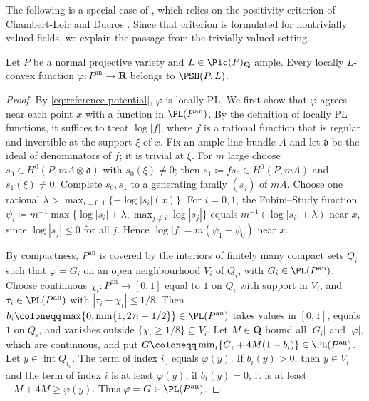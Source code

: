 \documentclass[11pt,a4paper]{article}
\newcommand{\an}{\mathrm{an}}          %
\begin{document}
The following is a special case of \cite[Theorem~3.23]{Wu26}, which relies on the positivity criterion of Chambert-Loir and Ducros \cite{CLD12}. Since that criterion is formulated for nontrivially valued fields, we explain the passage from the trivially valued setting.

\begin{lemma}\label{lem:local-PL-positivity}
Let $P$ be a normal projective variety and $L\in\Pic(P)_{\mathbf Q}$ ample. Every locally $L$-convex function $\varphi\colon P^{\an}\to\mathbf R$ belongs to $\PSH(P,L)$.
\end{lemma}

\begin{proof}
By \eqref{eq:reference-potential}, $\varphi$ is locally PL. We first show that $\varphi$ agrees near each point $x$ with a function in $\PL(P^{\an})$. By the definition of locally PL functions, it suffices to treat $\log|f|$, where $f$ is a rational function that is regular and invertible at the support $\xi$ of $x$. Fix an ample line bundle $A$ and let $\mathfrak d$ be the ideal of denominators of $f$; it is trivial at $\xi$. For $m$ large choose $s_0\in H^0(P,mA\otimes\mathfrak d)$ with $s_0(\xi)\ne0$; then $s_1\coloneqq fs_0\in H^0(P,mA)$ and $s_1(\xi)\ne0$. Complete $s_0,s_1$ to a generating family $(s_j)$ of $mA$. Choose one rational $\lambda>\max_{i=0,1}\{-\log|s_i|(x)\}$. For $i=0,1$, the Fubini--Study function $\psi_i\coloneqq m^{-1}\max\{\log|s_i|+\lambda,\max_{j\ne i}\log|s_j|\}$ equals $m^{-1}(\log|s_i|+\lambda)$ near $x$, since $\log|s_j|\le0$ for all $j$. Hence $\log|f|=m(\psi_1-\psi_0)$ near $x$.

By compactness, $P^{\an}$ is covered by the interiors of finitely many compact sets $Q_i$ such that $\varphi=G_i$ on an open neighbourhood $V_i$ of $Q_i$, with $G_i\in\PL(P^{\an})$. Choose continuous $\chi_i\colon P^{\an}\to[0,1]$ equal to $1$ on $Q_i$ with support in $V_i$, and $\tau_i\in\PL(P^{\an})$ with $|\tau_i-\chi_i|\le1/8$. Then $b_i\coloneqq\max\{0,\min\{1,2\tau_i-1/2\}\}\in\PL(P^{\an})$ takes values in $[0,1]$, equals $1$ on $Q_i$, and vanishes outside $\{\chi_i\ge1/8\}\subseteq V_i$. Let $M\in\mathbf Q$ bound all $|G_i|$ and $|\varphi|$, which are continuous, and put $G\coloneqq\min_i\{G_i+4M(1-b_i)\}\in\PL(P^{\an})$. Let $y\in\operatorname{int}Q_{i_0}$. The term of index $i_0$ equals $\varphi(y)$. If $b_i(y)>0$, then $y\in V_i$ and the term of index $i$ is at least $\varphi(y)$; if $b_i(y)=0$, it is at least $-M+4M\ge\varphi(y)$. Thus $\varphi=G\in\PL(P^{\an})$.


\end{proof}
\end{document}
